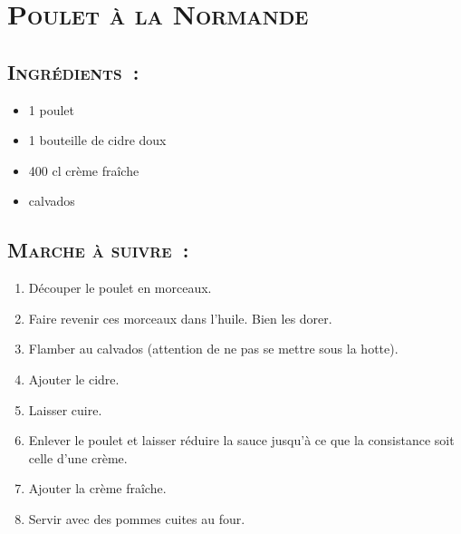 \section[\normalsize{Poulet \`a la Normande}]{\LARGE{\textsc{Poulet \`a la Normande}}}



\subsection*{\textsc{Ingr\'edients~:}}
\begin{itemize}
\item 1 poulet 
\item 1 bouteille de cidre doux
\item	400 cl crème fraîche
\item	calvados
\end{itemize}


\subsection*{\textsc{Marche \`a suivre~:}}
\begin{enumerate}
\item D\'ecouper le poulet en morceaux.
\item Faire revenir ces morceaux dans l’huile.
Bien les dorer.
\item Flamber au calvados (attention de ne pas se mettre sous la hotte).
\item Ajouter le cidre.
\item Laisser cuire.
\item Enlever le poulet et laisser r\'eduire la sauce jusqu’\`a ce que la consistance soit celle d’une cr\`eme.
\item Ajouter la cr\`eme fra\^iche.
\item Servir avec des pommes cuites au four. 
\end{enumerate}